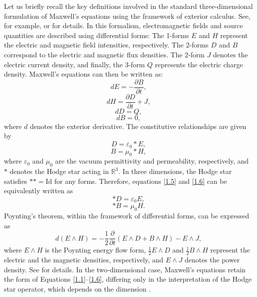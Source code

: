 \documentclass[english]{article}
\theoremstyle{plain}
\theoremstyle{definition}
\theoremstyle{remark}
\numberwithin{equation}{section}
\begin{document}
Let us briefly recall the key definitions involved in the standard three-dimensional formulation of Maxwell's equations using the framework of exterior calculus. See, for example, \cite{WR} or \cite{WR1} for details. In this formalism, electromagnetic fields and source quantities are described using differential forms:
The 1-forms
$E$ and $H$ represent the electric and magnetic field intensities, respectively. The 2-forms
$D$ and $B$ correspond to the electric and magnetic flux densities. The 2-form
$J$ denotes the electric current density, and finally, the 3-form
$Q$ represents the electric charge density.
Maxwell's equations can then be written as:
\begin{equation}\label{1.1}
 dE=-\frac{\partial B}{\partial t},
 \end{equation}
 \begin{equation}\label{1.2}
 dH=\frac{\partial D}{\partial t}+J,
 \end{equation}
 \begin{equation}\label{1.3}
 dD=Q,
 \end{equation}
 \begin{equation}\label{1.4}
 dB=0,
 \end{equation}
 where $d$ denotes the exterior derivative. The   constitutive relationships are given by
 \begin{equation}\label{1.5}
 D=\varepsilon_0\ast E,
 \end{equation}
 \begin{equation}\label{1.6}
 B=\mu_0\ast H,
 \end{equation}
 where $\varepsilon_0$  and $\mu_0$ are the vacuum permittivity and permeability, respectively, and $\ast$ denotes  the Hodge star acting in $\mathbb{R}^3$. In three dimensions, the Hodge star satisfies $\ast\ast = \mathrm{Id}$ for any forms.
Therefore, equations \eqref{1.5} and \eqref{1.6} can be equivalently written as
\begin{equation}\label{1.7}
 \ast D=\varepsilon_0 E,
 \end{equation}
 \begin{equation}\label{1.8}
 \ast B=\mu_0H.
 \end{equation}
Poynting's theorem, within the framework of differential forms, can be expressed as
 \begin{equation}\label{1.9}
d(E\wedge H)=-\frac{1}{2}\frac{\partial}{\partial t}(E\wedge D+B\wedge H)-E\wedge J,
\end{equation}
where $E\wedge H$ is the  Poynting energy flow form,
 $\frac{1}{2}E\wedge D$ and $\frac{1}{2}B\wedge H$ represent the electric and the magnetic densities, respectively, and $E\wedge J$ denotes the power density. See  \cite{WR} for details.
  In the two-dimensional case, Maxwell’s equations retain the form of Equations \eqref{1.1}–\eqref{1.6}, differing only in the interpretation of the Hodge star operator, which depends on the dimension \cite{WR1}.
\end{document}
